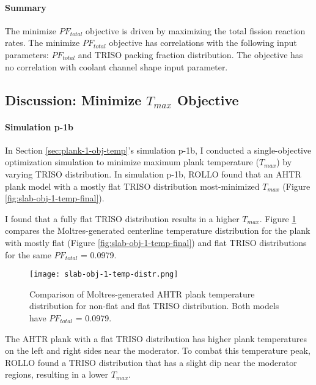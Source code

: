 \paragraph{Summary}
The minimize $PF_{total}$ objective is driven by maximizing the total fission reaction 
rates. 
The minimize $PF_{total}$ objective has correlations with the following input parameters: 
$PF_{total}$ and TRISO packing fraction distribution. 
The objective has no correlation with coolant channel shape input parameter. 

\subsection{Discussion: Minimize $T_{max}$ Objective}
\label{sec:plank-discussion-temp}
\paragraph{Simulation p-1b}
In Section \ref{sec:plank-1-obj-temp}'s simulation p-1b, I conducted a single-objective 
optimization simulation to minimize maximum plank temperature ($T_{max}$) by varying 
TRISO distribution. 
In simulation p-1b, \gls{ROLLO} found that an \gls{AHTR} plank model with a mostly 
flat TRISO distribution most-minimized $T_{max}$ 
(Figure \ref{fig:slab-obj-1-temp-final}).

I found that a fully flat \gls{TRISO} distribution results in a higher $T_{max}$.
Figure \ref{fig:slab-obj-1-temp-distr} compares the Moltres-generated centerline 
temperature distribution for the plank with mostly flat (Figure 
\ref{fig:slab-obj-1-temp-final}) and flat TRISO distributions for the same 
$PF_{total}$ = 0.0979. 
\begin{figure}[htbp!]
    \centering
    \texttt{[image: slab-obj-1-temp-distr.png]}
    \caption{Comparison of Moltres-generated AHTR plank temperature distribution for 
    non-flat and flat TRISO distribution. 
    Both models have $PF_{total}$ = 0.0979.}
    \label{fig:slab-obj-1-temp-distr}
\end{figure}
The \gls{AHTR} plank with a flat \gls{TRISO} distribution has higher plank temperatures 
on the left and right sides near the moderator. 
To combat this temperature peak, ROLLO found a \gls{TRISO} distribution that 
has a slight dip near the moderator regions, resulting in a lower $T_{max}$.

